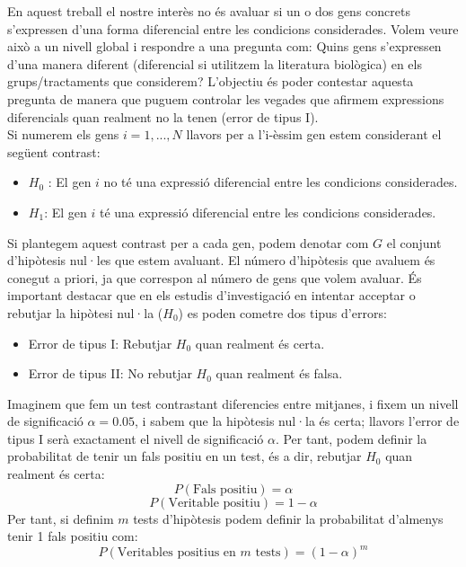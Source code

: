 \documentclass[english]{article}
\begin{document}
En aquest treball el nostre interès no és avaluar si un o dos gens concrets s'expressen d'una forma diferencial entre les condicions considerades. Volem veure això a un nivell global i respondre a una pregunta com: Quins gens s'expressen d'una manera diferent (diferencial si utilitzem la literatura biològica) en els grups/tractaments que considerem? L'objectiu és poder contestar aquesta pregunta de manera que puguem controlar les vegades que afirmem expressions diferencials quan realment no la tenen (error de tipus I).
\\

Si numerem els gens $i = 1,...,N$ llavors per a l'i-èssim gen estem considerant el següent contrast:
\begin{itemize}
\item $H_{0}$ : El gen $i$ no té una expressió diferencial entre les condicions considerades.
\item $H_{1}$: El gen $i$ té una expressió diferencial entre les condicions considerades.
\end{itemize}
Si plantegem aquest contrast per a cada gen, podem denotar com $G$ el conjunt d'hipòtesis nul·les que estem avaluant. El número d'hipòtesis que avaluem és conegut a priori, ja que correspon al número de gens que volem avaluar. És important destacar que en els estudis d'investigació en intentar acceptar o rebutjar la hipòtesi nul·la ($H_{0}$) es poden cometre dos tipus d'errors:
\begin{itemize}
\item Error de tipus I: Rebutjar $H_{0}$ quan realment és certa.
\item Error de tipus II: No rebutjar $H_{0}$ quan realment és falsa.
\end{itemize}
Imaginem que fem un test contrastant diferencies entre mitjanes, i fixem un nivell de significació $\alpha=0.05$, i sabem que la hipòtesis nul·la és certa; llavors l'error de tipus I serà exactament el nivell de significació $\alpha$. Per tant, podem definir la probabilitat de tenir un fals positiu en un test, és a dir, rebutjar $H_{0}$ quan realment és certa:
\begin{equation*}
P(\text{Fals positiu}) = \alpha
\end{equation*}
\begin{equation*}
P(\text{Veritable positiu}) = 1 - \alpha
\end{equation*}
Per tant, si definim $m$ tests d'hipòtesis podem definir la probabilitat d'almenys tenir 1 fals positiu com:
\begin{equation*}
P(\text{Veritables positius en $m$ tests}) = (1 - \alpha)^m
\end{equation*}
\end{document}
